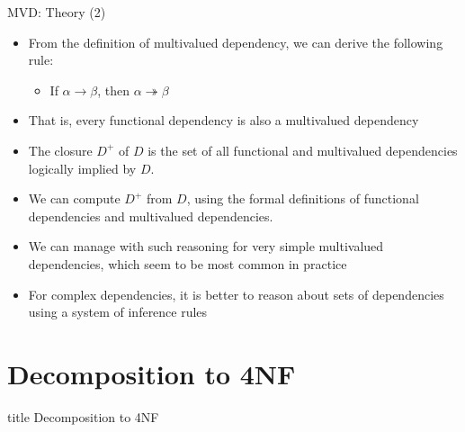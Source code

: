 \documentclass[aspectratio=169, xcolor=dvipsnames]{beamer}
\begin{document}
\begin{frame}{MVD: Theory (2)}
    \begin{itemize}[<+->]
        \item From the definition of multivalued dependency, we can derive the following rule:
        \begin{itemize}
            \item[$\triangleright$] If $\alpha \rightarrow \beta$, then $\alpha \twoheadrightarrow \beta$
        \end{itemize}
        \item That is, every functional dependency is also a multivalued dependency
        \item The closure $D^+$ of $D$ is the set of all functional and multivalued dependencies logically implied by $D$.
        \item We can compute $D^+$ from $D$, using the formal definitions of functional dependencies and multivalued dependencies.
        \item We can manage with such reasoning for very simple multivalued dependencies, which seem to be most common in practice
        \item For complex dependencies, it is better to reason about sets of dependencies using a system of inference rules
    \end{itemize}
\end{frame}

\section{Decomposition to 4NF}
\begin{frame}
  \vfill
  \centering
  \begin{beamercolorbox}[sep=8pt,center,shadow=true,rounded=true]{title}
    Decomposition to 4NF\par%
  \end{beamercolorbox}
  \vfill
\end{frame}
\end{document}
